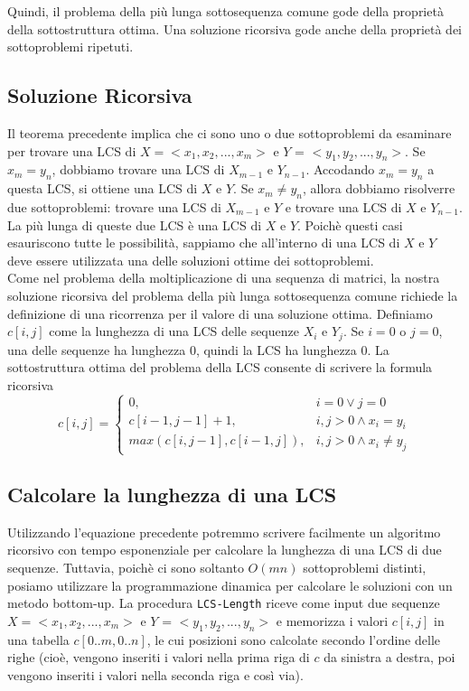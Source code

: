 Quindi, il problema della più lunga sottosequenza comune gode della
proprietà della sottostruttura ottima. Una soluzione ricorsiva gode
anche della proprietà dei sottoproblemi ripetuti.

\subsection{Soluzione Ricorsiva}

Il teorema precedente implica che ci sono uno o due sottoproblemi da
esaminare per trovare una LCS di $X = <x_1, x_2, ..., x_m>$ e $Y$ =
$<y_1, y_2, ..., y_n>$. Se $x_m = y_n$, dobbiamo trovare una LCS di
$X_{m-1}$ e $Y_{n-1}$. Accodando $x_m = y_n$ a questa LCS, si
ottiene una LCS di $X$ e $Y$. Se $x_m \neq y_n$, allora dobbiamo
risolverre due sottoproblemi: trovare una LCS di $X_{m-1}$ e $Y$ e
trovare una LCS di $X$ e $Y_{n-1}$. La più lunga di queste due LCS è
una LCS di $X$ e $Y$. Poichè questi casi esauriscono tutte le
possibilità, sappiamo che all'interno di una LCS di $X$ e $Y$ deve
essere utilizzata una delle soluzioni ottime dei sottoproblemi.\\

Come nel problema della moltiplicazione di una sequenza di matrici, la
nostra soluzione ricorsiva del problema della più lunga sottosequenza
comune richiede la definizione di una ricorrenza per il valore di una
soluzione ottima. Definiamo $c[i,j]$ come la lunghezza di una LCS
delle sequenze $X_i$ e $Y_j$. Se $i = 0$ o $j = 0$, una delle
sequenze ha lunghezza 0, quindi la LCS ha lunghezza 0. La sottostruttura
ottima del problema della LCS consente di scrivere la formula ricorsiva\\

$$
  c[i,j]= \begin{cases}
    0,                         & i = 0 \vee j = 0\\
    c[i-1, j-1] + 1,           & i, j > 0 \wedge x_i = y_i\\
    max(c[i, j-1], c[i-1, j]), & i,j > 0 \wedge x_i \neq y_j
  \end{cases}
$$

\subsection{Calcolare la lunghezza di una LCS}

Utilizzando l'equazione precedente potremmo scrivere facilmente un
algoritmo ricorsivo con tempo esponenziale per calcolare la lunghezza di
una LCS di due sequenze. Tuttavia, poichè ci sono soltanto $O(mn)$
sottoproblemi distinti, posiamo utilizzare la programmazione dinamica
per calcolare le soluzioni con un metodo bottom-up. La procedura
\texttt{LCS-Length} riceve come input due sequenze
$X = <x_1, x_2, ..., x_m>$ e $Y$ = $<y_1, y_2, ..., y_n>$ e
memorizza i valori $c[i,j]$ in una tabella $c[0..m, 0..n]$, le cui
posizioni sono calcolate secondo l'ordine delle righe (cioè, vengono
inseriti i valori nella prima riga di $c$ da sinistra a destra, poi
vengono inseriti i valori nella seconda riga e così via).\\

